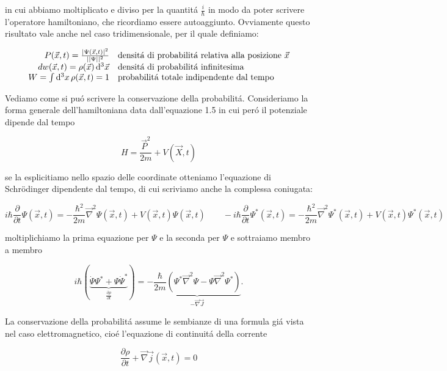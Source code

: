 in cui abbiamo moltiplicato e diviso per la quantit\'a $\frac{i}{\hbar}$ in modo da poter scrivere l'operatore hamiltoniano, che ricordiamo essere autoaggiunto. Ovviamente questo risultato vale anche nel caso tridimensionale, per il quale definiamo:

$$\begin{array}{r l}{P({\vec{x}},t)
	={\frac{|\Psi({\vec{x}},t)|^{2}}{||\Psi||^{2}}}}&{\text{densit\'a di probabilit\'a relativa alla posizione } \vec{x}}
	\\ 
	{d w({\vec{x}},t)=\rho({\vec{x}})\,\mathrm{d}^{3}{\vec{x}}} & \text{densit\'a di probabilit\'a infinitesima}
	\\
	{W=\int\mathrm{d}^{3}x\,\rho({\vec{x}},t)=1}&\text{probabilit\'a totale indipendente dal tempo}
	\end{array}$$

Vediamo come si pu\'o scrivere la conservazione della probabilit\'a. Consideriamo la forma generale dell'hamiltoniana data dall'equazione 1.5 in cui per\'o il potenziale dipende dal tempo

\begin{equation} 
	H={\frac{\vec{P}^{2}}{2m}}+V(\vec{X},t)
\end{equation}

se la esplicitiamo nello spazio delle coordinate otteniamo l'equazione di Schr\"odinger dipendente dal tempo, di cui scriviamo anche la complessa coniugata:

$$i\hbar\frac{\partial}{\partial t}\Psi(\vec{x},t)=-\frac{\hbar^{2}}{2m}\vec{\nabla}^{2}\Psi(\vec{x},t)+V(\vec{x},t)\Psi(\vec{x},t)\qquad-i\hbar\frac{\partial}{\partial t}\Psi^{*}(\vec{x},t)=-\frac{\hbar^{2}}{2m}\vec{\nabla}^{2}\Psi^{*}(\vec{x},t)+V(\vec{x},t)\Psi^{*}(\vec{x},t)$$

moltiplichiamo la prima equazione per $\Psi$ e la seconda per $\Psi$ e sottraiamo membro a membro

$$i\hbar(\underbrace{\dot{\Psi}\Psi^{*}+\Psi\dot{\Psi}^{*}}_{\frac{\partial\rho}{\partial t}})=-\underbrace{\frac{\hbar}{2m}(\Psi^{*}\vec{\nabla}^{2}\Psi-\Psi\vec{\nabla}^{2}\Psi^{*})}_{-\vec{\nabla} \vec{J}}.$$
	
La conservazione della probabilit\'a assume le sembianze di una formula gi\'a vista nel caso elettromagnetico, cio\'e l'equazione di continuit\'a della corrente

$${\frac{\partial\rho}{\partial t}}+\vec{\nabla}\vec{j}(\vec{x},t)=0$$	


